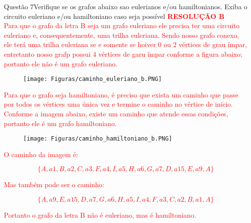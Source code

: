 \documentclass[12pt]{article}
\begin{document}
\begin{section}{Questão 7}{Verifique se os grafos abaixo sao eulerianos e/ou hamiltonianos. Exiba o circuito euleriano e/ou hamiltoniano caso seja possível}
\noindent \textbf{\textcolor{red}{RESOLUÇÃO B}}\\

\noindent \textcolor{red}{Para que o grafo da letra B seja um grafo euleriano ele precisa ter uma circuito euleriano e, consequentemente, uma trilha euleriana. Sendo nosso grafo conexo, ele terá uma trilha euleriana se e somente se hoiver 0 ou 2 vértices de grau ímpar, entretanto nosso grafp possui 4 vértices de garu ímpar conforme a figura abaixo; portanto ele não é um grafo euleriano.}

\begin{figure}[H]
    \centering
    \texttt{[image: Figuras/caminho\_euleriano\_b.PNG]}
\end{figure}

\noindent \textcolor{red}{Para que o grafo seja hamiltoniano, é preciso que exista um caminho que passe por todos os vértices uma única vez e termine o caminho no vértice de início. Conforme a imagem abaixo, existe um caminho que atende essas condições, portanto ele é um grafo hamiltoniano.}

\begin{figure}[H]
    \centering
    \texttt{[image: Figuras/caminho\_hamiltoniano\_b.PNG]}
\end{figure}

\noindent \textcolor{red}{O caminho da imagem é:}

\textcolor{red}{$$\{A, a1, B, a2, C, a3, F, a4, I, a5, H, a6, G, a7, D, a15, E, a9, A \}$$}

\noindent \textcolor{red}{Mas também pode ser o caminho:}

\textcolor{red}{$$\{A, a9, E, a15, D, a7, G, a6, H, a5, I, a4, F, a3, C, a2, B, a1, A\}$$}

\noindent \textcolor{red}{Portanto o grafo da letra B não é euleriano, mas é hamiltoniano.}

\end{section}
\newpage
\end{document}
